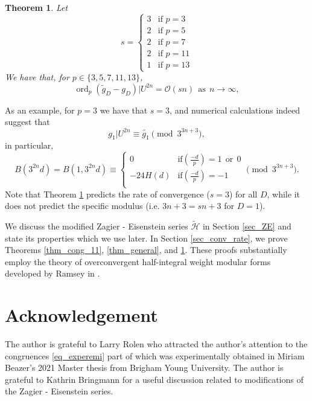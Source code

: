 \documentclass[11pt,letterpaper]{amsart}
\newcommand{\cO}{{\mathcal O}}
\DeclareMathOperator{\ord}{ord}
\newtheorem{thm}{Theorem}
\theoremstyle{remark}
\begin{document}
\begin{thm} \label{thm_3_5_7_11}
Let
\[
s= \begin{cases}
3 &  \text{if } p=3 \\
2 &  \text{if } p=5 \\
2 &  \text{if } p=7 \\
2 &  \text{if } p=11 \\
1 &  \text{if } p=13
\end{cases}
\]
We have that, for $p \in \{3,5,7,11,13\}$, 
\[
\ord_p \left(\tilde{g}_D - g_D\right)|U^{2n} = \cO(sn) ~~\text{as} ~~ n \rightarrow \infty,
\]

\end{thm}
As an example,  for $p=3$ we have that $s=3$, and numerical calculations indeed suggest that 
\[
g_1|U^{2n} \equiv \tilde{g_1} \pmod 3^{3n+3},
\]
in particular, 
\begin{equation} \label{eq_experemi}
B(3^{2n}d) = B(1,3^{2n}d) \equiv 
\left\{ \begin{array}{ll}
0 & \text{if} \left(\frac{-d}{p}\right) =1~~ \text{or} ~~ 0 \\
-24H(d) & \text{if} \left(\frac{-d}{p}\right) =-1  \\ 
\end{array} \right. \pmod{3^{3n+3}}. 
\end{equation}
Note that Theorem \ref{thm_3_5_7_11} predicts the rate of convergence ($s=3$) for all $D$, while it does not predict the specific modulus (i.e. $3n+3=sn+3$ for $D=1$).



We discuss the modified Zagier - Eisenstein series $\tilde{\mathcal{H}}$ in Section \ref{sec_ZE} and state its properties which we use later. 
In Section \ref{sec_conv_rate}, we prove Theorems   \ref{thm_cong_11}, \ref{thm_general}, and  \ref{thm_3_5_7_11}. These proofs substantially employ the theory of overconvergent half-integral weight modular forms developed by Ramsey in \cite{Ramsey2006,Ramsey,Ramsey_sh}.


\section* {Acknowledgement}
The author is grateful to Larry Rolen who attracted the author's attention to the congruences \eqref{eq_experemi} part of which was experimentally obtained in Miriam Beazer's 2021 Master thesis from Brigham Young University. The author is grateful to Kathrin Bringmann for a useful discussion related to modifications of the  Zagier - Eisenstein series. 
\end{document}
